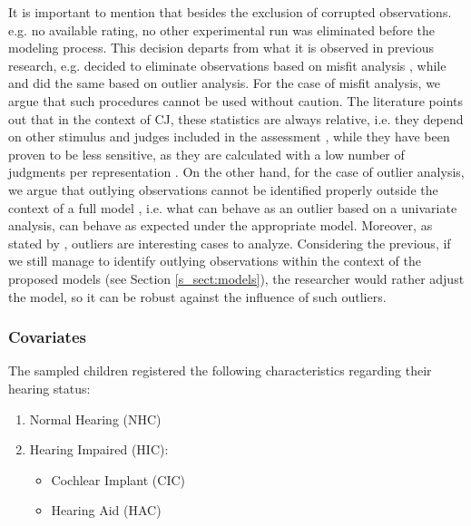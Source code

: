 It is important to mention that besides the exclusion of corrupted observations. e.g. no available rating, no other experimental run was eliminated before the modeling process. This decision departs from what it is observed in previous research, e.g. \citet{Boonen_et_al_2020} decided to eliminate observations based on misfit analysis \citep{Lesterhuis_2018}, while \citet{vanDaal_2020} and \citet{Boonen_et_al_2021} did the same based on outlier analysis. For the case of misfit analysis, we argue that such procedures cannot be used without caution. The literature points out that in the context of CJ, these statistics are always relative, i.e. they depend on other stimulus and judges included in the assessment \citep{Pollitt_2012a, Pollitt_2012b}, while they have been proven to be less sensitive, as they are calculated with a low number of judgments per representation \citep{Pollitt_2012a}. On the other hand, for the case of outlier analysis, we argue that outlying observations cannot be identified properly outside the context of a full model \citep{McElreath_2020}, i.e. what can behave as an outlier based on a univariate analysis, can behave as expected under the appropriate model. Moreover, as stated by \citet{McElreath_2020}, outliers are interesting cases to analyze. Considering the previous, if we still manage to identify outlying observations within the context of the proposed models (see Section \ref{s_sect:models}), the researcher would rather adjust the model, so it can be robust against the influence of such outliers.
%
%
\subsubsection{Covariates} \label{ss_sect:covariates}
%
The sampled children registered the following characteristics regarding their hearing status:
	\begin{enumerate}
		\item Normal Hearing (NHC)
		\item Hearing Impaired (HIC):
		\begin{itemize}
			\item Cochlear Implant (CIC) 
			\item Hearing Aid (HAC)
		\end{itemize}
	\end{enumerate}


